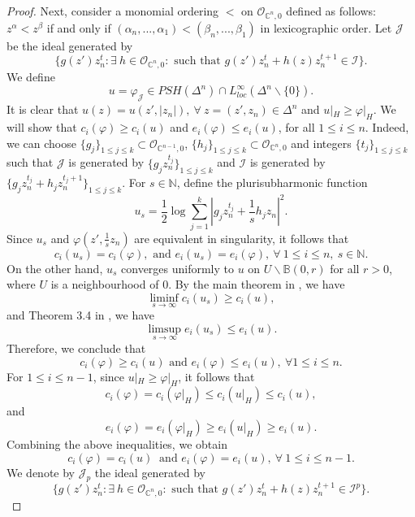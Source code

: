 \documentclass[a4paper,oneside,reqno,11pt]{article}
\begin{document}
\begin{proof}
Next, consider a monomial ordering $<$ on $\mathcal O_{ \mathbb C^n , 0 }$ defined as follows: $z^{ \alpha } < z^{ \beta }$ if and only if $( \alpha_n, ..., \alpha_1 )< ( \beta_n, ..., \beta_1 )$ in lexicographic order. Let $\mathcal J$ be the ideal generated by
$$\{ g( z' ) z_n^t: \exists\ h\in\mathcal O_{ \mathbb C^n , 0 }: \text{ such that } g ( z' ) z_n^t + h ( z ) z_n^{ t + 1 }\in\mathcal I \}.$$
We define
$$u = \varphi_{ \mathcal J } \in PSH ( \Delta^n )\cap L_{ loc }^{ \infty } ( \Delta^n\backslash \{ 0 \} ).$$
It is clear that $u ( z ) = u ( z' , | z_n | ),\ \forall\ z = ( z', z_n )\in \Delta^n$  and $u |_{ H } \geq \varphi |_{ H }$. We will show that $c_i (\varphi ) \geq c_i ( u )$ and $e_i (\varphi ) \leq e_i ( u )$, for all $1\leq i\leq n$. Indeed, we can choose $\{ g_j \}_{ 1\leq j\leq k }\subset\mathcal O_{ \mathbb C^{ n - 1 } , 0 }$, $\{ h_j \}_{ 1\leq j\leq k }\subset\mathcal O_{ \mathbb C^{ n } , 0 }$ and integers $\{ t_j \}_{ 1\leq j\leq k }$ such that $\mathcal J$ is generated by $\{ g_j z_n^{ t_j } \}_{ 1\leq j\leq k}$ and $\mathcal I$ is generated by $\{ g_j z_n^{ t_j } + h_j z_n^{ t_j + 1 } \}_{ 1\leq j\leq k }$. For $s\in\mathbb N$, define the plurisubharmonic function
$$u_s= \frac { 1 } { 2 } \log \sum\limits_{ j = 1 }^k | g_j z_n^{ t_j } + \frac { 1 } { s }  h_j z_n |^2.$$
Since $u_s$ and $\varphi ( z' , \frac { 1 } { s } z_n )$ are equivalent in singularity, it follows that
$$c_i ( u_s ) = c_i ( \varphi ), \text{ and } e_i ( u_s ) = e_i ( \varphi ), \ \forall\ 1\leq i\leq n,\ s\in\mathbb N.$$
On the other hand, $u_s$ converges uniformly to $u$ on $U\backslash \mathbb B (0,r)$ for all $r >0$, where $U$ is a neighbourhood of $0$. By the main theorem in \cite{DK01}, we have
$$\liminf\limits_{s\to\infty} c_i (u_s ) \geq c_i (u ),$$
and Theorem 3.4 in \cite{Hi08} , we have
$$\limsup\limits_{s\to\infty} e_i ( u_s ) \leq e_i (u ).$$
Therefore, we conclude that
$$c_i (\varphi ) \geq c_i ( u ) \text{ and } e_i (\varphi ) \leq e_i ( u ),\ \forall 1\leq i\leq n.$$ 
For $1\leq i \leq n-1$, since $u |_{ H } \geq \varphi |_{ H }$, it follows that
$$c_i (\varphi ) = c_i ( \varphi |_{ H } ) \leq c_i ( u |_{ H } ) \leq c_i ( u ),$$
and 
$$e_i (\varphi ) = e_i ( \varphi |_{ H } ) \geq e_i ( u |_{ H } ) \geq e_i ( u ).$$
Combining the above inequalities, we obtain 
$$c_i (\varphi ) = c_i ( u )\ \text{ and } e_i (\varphi ) = e_i ( u ),\ \forall\ 1\leq i\leq n - 1.$$ 
We denote by $\mathcal {J}_p$ the ideal generated by 
$$\{ g( z' ) z_n^t: \exists\ h\in\mathcal O_{ \mathbb C^n , 0 }: \text{ such that } g ( z' ) z_n^t + h ( z ) z_n^{ t + 1 }\in\mathcal {I}^p\}.$$

\end{proof}
\end{document}
